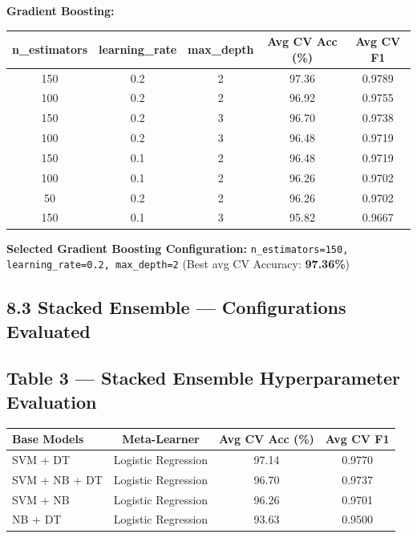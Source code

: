 \documentclass[12pt,a4paper]{article}
\begin{document}
\vspace{8pt}
\textbf{Gradient Boosting:}
\begin{center}
\begin{tabular}{ccccc}
\toprule
\textbf{n\_estimators} & \textbf{learning\_rate} & \textbf{max\_depth}
  & \textbf{Avg CV Acc (\%)} & \textbf{Avg CV F1} \\
\midrule
150 & 0.2 & 2 & 97.36 & 0.9789 \\
100 & 0.2 & 2 & 96.92 & 0.9755 \\
150 & 0.2 & 3 & 96.70 & 0.9738 \\
100 & 0.2 & 3 & 96.48 & 0.9719 \\
150 & 0.1 & 2 & 96.48 & 0.9719 \\
100 & 0.1 & 2 & 96.26 & 0.9702 \\
50  & 0.2 & 2 & 96.26 & 0.9702 \\
150 & 0.1 & 3 & 95.82 & 0.9667 \\
\bottomrule
\end{tabular}
\end{center}

\textbf{Selected Gradient Boosting Configuration:}
\texttt{n\_estimators=150, learning\_rate=0.2, max\_depth=2}
(Best avg CV Accuracy: \textbf{97.36\%})

\subsection*{8.3 Stacked Ensemble — Configurations Evaluated}

\subsection*{Table 3 — Stacked Ensemble Hyperparameter Evaluation}

\begin{center}
\begin{tabular}{lccc}
\toprule
\textbf{Base Models}     & \textbf{Meta-Learner}
  & \textbf{Avg CV Acc (\%)} & \textbf{Avg CV F1} \\
\midrule
SVM + DT        & Logistic Regression & 97.14 & 0.9770 \\
SVM + NB + DT   & Logistic Regression & 96.70 & 0.9737 \\
SVM + NB        & Logistic Regression & 96.26 & 0.9701 \\
NB + DT         & Logistic Regression & 93.63 & 0.9500 \\
\bottomrule
\end{tabular}
\end{center}
\end{document}
